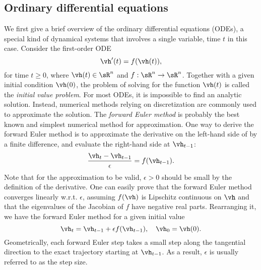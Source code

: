 \subsection{Ordinary differential equations}


We first give a brief overview of the ordinary differential equations (ODEs), a special kind of dynamical systems that involves a single variable, time $t$ in this case.
Consider the first-order ODE
\begin{equation}
    \label{eq:generic_ODE}
    \vh'(t)
    = 
    f(\vh(t)),
\end{equation}
for time $t \geq 0$,
where $\vh(t) \in \sR^n$ and $f: \sR^n \to \sR^n$. 
Together with a given initial condition $\vh(0)$, the problem of solving for the function $\vh(t)$ is called the \textit{initial value problem}. For most ODEs, it is impossible to find an analytic solution. Instead, numerical methods relying on discretization are commonly used to approximate the solution.  
The \textit{forward Euler method} is probably the best known and simplest numerical method for approximation. 
One way to derive the forward Euler method is to approximate the derivative on the left-hand side of  by a finite difference, and evaluate the right-hand side at $\vh_{t-1}$:
\begin{equation}
    \frac
    {\vh_{t} - \vh_{t-1}}
    {\epsilon}
    =
    f(\vh_{t-1}).
\end{equation}
Note that for the approximation to be valid,  $\epsilon>0$ should be small by the definition of the derivative. One can easily prove that the forward Euler method converges linearly w.r.t. $\epsilon$, assuming $f(\vh)$ is Lipschitz continuous on $\vh$ and that the eigenvalues of the Jacobian of $f$ have negative real parts.   
Rearranging it, we have the forward Euler method for a given initial value
\begin{equation}
    \vh_{t}
    =
    \vh_{t-1} + \epsilon f(\vh_{t-1}),
    \quad
    \vh_0 = \vh(0).
\end{equation}
Geometrically, each forward Euler step takes a small step along the tangential direction to the exact trajectory starting at $\vh_{t-1}$.
As a result, $\epsilon$ is usually referred to as the step size.

